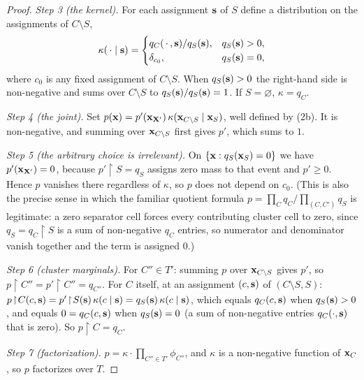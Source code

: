 \documentclass{article} %
\newcommand{\restr}{\!\restriction\!}
\begin{document}
\begin{proof}
\emph{Step 3 (the kernel).} For each assignment $\mathbf{s}$ of $S$ define a
distribution on the assignments of $C\setminus S$,
\[
  \kappa(\,\cdot\mid \mathbf{s})=
  \begin{cases}
    q_C(\,\cdot\,,\mathbf{s})/q_S(\mathbf{s}), & q_S(\mathbf{s})>0,\\
    \delta_{c_0}, & q_S(\mathbf{s})=0,
  \end{cases}
\]
where $c_0$ is any fixed assignment of $C\setminus S$. When $q_S(\mathbf{s})>0$ the
right-hand side is non-negative and sums over $C\setminus S$ to
$q_S(\mathbf{s})/q_S(\mathbf{s})=1$. If $S=\varnothing$, $\kappa=q_C$.

\emph{Step 4 (the joint).} Set $p(\mathbf{x})=p'(\mathbf{x}_{\mathbf{X}'})\,\kappa(\mathbf{x}_{C\setminus S}\mid
\mathbf{x}_S)$, well defined by (2b). It is non-negative, and summing over
$\mathbf{x}_{C\setminus S}$ first gives $p'$, which sums to $1$.

\emph{Step 5 (the arbitrary choice is irrelevant).} On $\{\mathbf{x}:q_S(\mathbf{x}_S)=0\}$ we have
$p'(\mathbf{x}_{\mathbf{X}'})=0$, because $p'\restr S=q_S$ assigns zero mass to that event
and $p'\ge0$. Hence $p$ vanishes there regardless of $\kappa$, so $p$ does not
depend on $c_0$. (This is also the precise sense in which the familiar quotient
formula $p=\prod_C q_C/\prod_{(C,C')}q_S$ is legitimate: a zero separator cell
forces every contributing cluster cell to zero, since $q_S=q_C\restr S$ is a sum
of non-negative $q_C$ entries, so numerator and denominator vanish together and
the term is assigned $0$.)

\emph{Step 6 (cluster marginals).} For $C''\in T'$: summing $p$ over
$\mathbf{x}_{C\setminus S}$ gives $p'$, so $p\restr C''=p'\restr C''=q_{C''}$. For $C$
itself, at an assignment $(c,\mathbf{s})$ of $(C\setminus S,S)$:
$p\restr C(c,\bs)=p'\restr S(\bs)\,\kappa(c\mid \bs)=q_S(\bs)\,\kappa(c\mid \bs)$,
which equals $q_C(c,\mathbf{s})$ when $q_S(\mathbf{s})>0$, and equals $0=q_C(c,\mathbf{s})$ when
$q_S(\mathbf{s})=0$ (a sum of non-negative entries $q_C(\cdot,\mathbf{s})$ that is zero). So
$p\restr C=q_C$.

\emph{Step 7 (factorization).} $p=\kappa\cdot\prod_{C''\in T'}\phi_{C''}$, and
$\kappa$ is a non-negative function of $\mathbf{x}_C$, so $p$ factorizes over $T$.
\end{proof}
\end{document}
